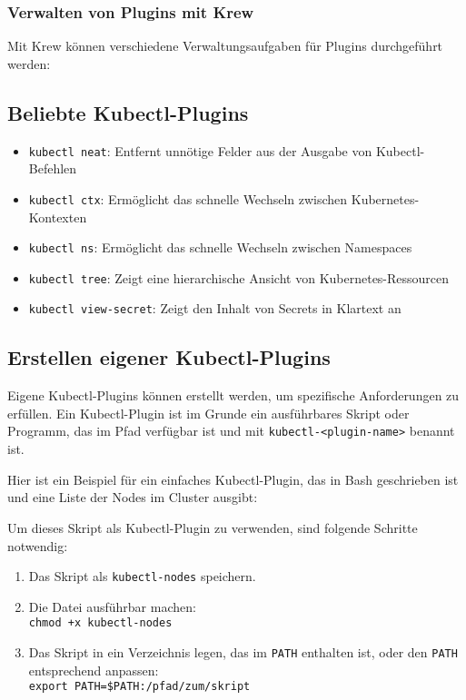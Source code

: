 \subsubsection{Verwalten von Plugins mit Krew}
Mit Krew können verschiedene Verwaltungsaufgaben für Plugins durchgeführt werden:


\subsection{Beliebte Kubectl-Plugins}
\begin{itemize}
    \item \texttt{kubectl neat}: Entfernt unnötige Felder aus der Ausgabe von Kubectl-Befehlen
    \item \texttt{kubectl ctx}: Ermöglicht das schnelle Wechseln zwischen Kubernetes-Kontexten
    \item \texttt{kubectl ns}: Ermöglicht das schnelle Wechseln zwischen Namespaces
    \item \texttt{kubectl tree}: Zeigt eine hierarchische Ansicht von Kubernetes-Ressourcen
    \item \texttt{kubectl view-secret}: Zeigt den Inhalt von Secrets in Klartext an
\end{itemize}

\subsection{Erstellen eigener Kubectl-Plugins}
Eigene Kubectl-Plugins können erstellt werden, um spezifische Anforderungen zu erfüllen. Ein Kubectl-Plugin ist im Grunde ein ausführbares Skript oder Programm, das im Pfad verfügbar ist und mit \texttt{kubectl-<plugin-name>} benannt ist.

Hier ist ein Beispiel für ein einfaches Kubectl-Plugin, das in Bash geschrieben ist und eine Liste der Nodes im Cluster ausgibt:


Um dieses Skript als Kubectl-Plugin zu verwenden, sind folgende Schritte notwendig:

\begin{enumerate}
    \item Das Skript als \texttt{kubectl-nodes} speichern.
    \item Die Datei ausführbar machen:\\
    \texttt{chmod +x kubectl-nodes}
    \item Das Skript in ein Verzeichnis legen, das im \texttt{PATH} enthalten ist, oder den \texttt{PATH} entsprechend anpassen:\\
    \texttt{export PATH=\$PATH:/pfad/zum/skript}
\end{enumerate}

